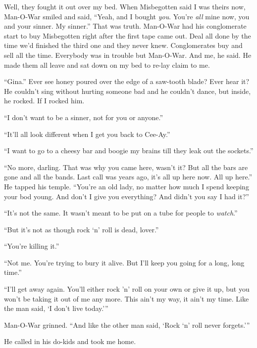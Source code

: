 Well, they fought it out over my bed. When Misbegotten said I was theirs now, Man-O-War smiled and said, ``Yeah, and I bought \textit{you}. You're \textit{all} mine now, you and your sinner. My sinner.'' That was truth. Man-O-War had his conglomerate start to buy Misbegotten right after the first tape came out. Deal all done by the time we'd finished the third one and they never knew. Conglomerates buy and sell all the time. Everybody was in trouble but Man-O-War. And me, he said. He made them all leave and sat down on my bed to re-lay claim to me.

``Gina.'' Ever see honey poured over the edge of a saw-tooth blade? Ever hear it? He couldn't sing without hurting someone bad and he couldn't dance, but inside, he rocked. If I rocked him.

``I don't want to be a sinner, not for you or anyone.''

``It'll all look different when I get you back to Cee-Ay.''

``I want to go to a cheesy bar and boogie my brains till they leak out the sockets.''

``No more, darling. That was why you came here, wasn't it? But all the bars are gone and all the bands. Last call was years ago, it's all up here now. All up here.'' He tapped his temple. ``You're an old lady, no matter how much I spend keeping your bod young. And don't I give you everything? And didn't you say I had it?''

``It's not the same. It wasn't meant to be put on a tube for people to \textit{watch}.''

``But it's not as though rock `n' roll is dead, lover.''

``You're killing it.''

``Not me. You're trying to bury it alive. But I'll keep you going for a long, long time.''

``I'll get away again. You'll either rock 'n' roll on your own or give it up, but you won't be taking it out of me any more. This ain't my way, it ain't my time. Like the man said, `I don't live today.'''

Man-O-War grinned. ``And like the other man said, `Rock `n' roll never forgets.'''

He called in his do-kids and took me home.
